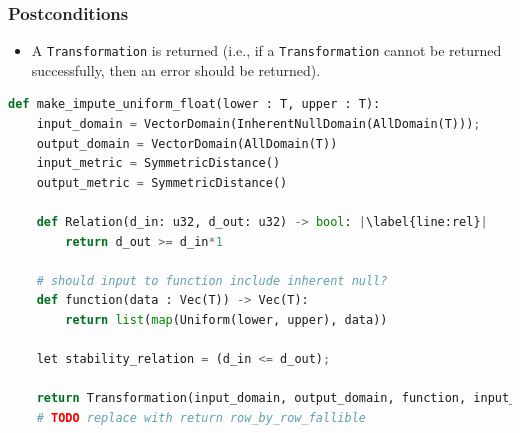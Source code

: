 \documentclass[11pt,a4paper]{article}
\begin{document}
\subsubsection*{Postconditions}
\begin{itemize}
    \item A \texttt{Transformation} is returned (i.e., if a \texttt{Transformation} cannot be returned successfully, then an error should be returned).
\end{itemize}


\begin{lstlisting}[language=Python, escapechar=|]
def make_impute_uniform_float(lower : T, upper : T):
    input_domain = VectorDomain(InherentNullDomain(AllDomain(T)));
    output_domain = VectorDomain(AllDomain(T))
    input_metric = SymmetricDistance()
    output_metric = SymmetricDistance()

    def Relation(d_in: u32, d_out: u32) -> bool: |\label{line:rel}|
        return d_out >= d_in*1
    
    # should input to function include inherent null?
    def function(data : Vec(T)) -> Vec(T): 
        return list(map(Uniform(lower, upper), data))

    let stability_relation = (d_in <= d_out);
    
    return Transformation(input_domain, output_domain, function, input_metric, output_metric, stability_relation)
    # TODO replace with return row_by_row_fallible

\end{lstlisting}
\end{document}

